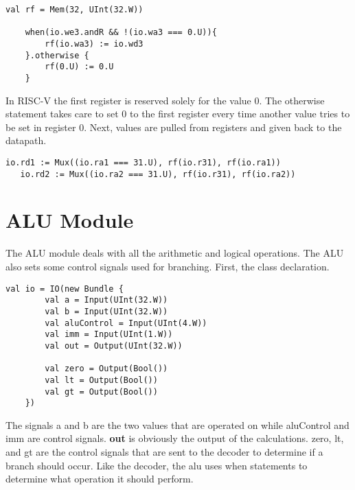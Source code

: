 \documentclass[12pt, letterpaper]{report}
\begin{document}
\begin{lstlisting}[style=scala]
   val rf = Mem(32, UInt(32.W))

    when(io.we3.andR && !(io.wa3 === 0.U)){
        rf(io.wa3) := io.wd3
    }.otherwise {
        rf(0.U) := 0.U
    }
\end{lstlisting}

In RISC-V the first register is reserved solely for the value 0. The otherwise statement takes care to set 0
to the first register every time another value tries to be set in register 0. Next, values are pulled from registers
and given back to the datapath. 

\begin{lstlisting}[style=scala]
   io.rd1 := Mux((io.ra1 === 31.U), rf(io.r31), rf(io.ra1))
   io.rd2 := Mux((io.ra2 === 31.U), rf(io.r31), rf(io.ra2))
\end{lstlisting}




\section{ALU Module}
The ALU module deals with all the arithmetic and logical operations. The ALU also sets some control signals
used for branching. First, the class declaration. 

\begin{lstlisting}[style=scala]
   val io = IO(new Bundle {
        val a = Input(UInt(32.W))
        val b = Input(UInt(32.W))
        val aluControl = Input(UInt(4.W))
        val imm = Input(UInt(1.W))
        val out = Output(UInt(32.W))

        val zero = Output(Bool())
        val lt = Output(Bool())
        val gt = Output(Bool())
    })
\end{lstlisting}

The signals a and b are the two values that are operated on while aluControl and imm are control signals. \textbf{out}
is obviously the output of the calculations. zero, lt, and gt are the control signals that are sent to the decoder to
determine if a branch should occur. Like the decoder, the alu uses when statements to determine what operation it should perform.
\end{document}
